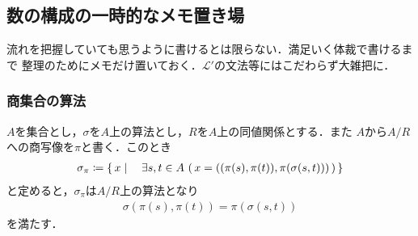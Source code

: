 \subsection{数の構成の一時的なメモ置き場}
	流れを把握していても思うように書けるとは限らない．満足いく体裁で書けるまで
	整理のためにメモだけ置いておく．$\mathcal{L}'$の文法等にはこだわらず大雑把に．
	
\subsubsection{商集合の算法}
	$A$を集合とし，$\sigma$を$A$上の算法とし，$R$を$A$上の同値関係とする．また
	$A$から$A/R$への商写像を$\pi$と書く．このとき
	\begin{align}
		\sigma_\pi \coloneqq \left\{\, x \mid \quad \exists s,t \in A\, 
		\left(\, x=((\pi(s),\pi(t)),\pi(\sigma(s,t)))\, \right)\, \right\}
	\end{align}
	と定めると，$\sigma_\pi$は$A/R$上の算法となり
	\begin{align}
		\sigma(\pi(s),\pi(t)) = \pi(\sigma(s,t))
	\end{align}
	を満たす．
	
